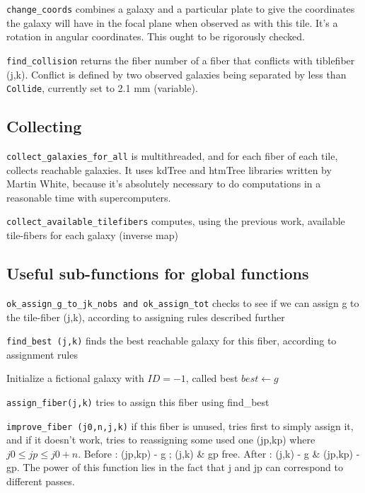 \documentclass{extarticle}
\begin{document}
{\tt change\_coords} combines a galaxy and a particular plate to give the coordinates the galaxy will have in the focal plane when observed as with this tile. It's a rotation in angular coordinates. This ought to be rigorously checked.

{\tt find\_collision} returns the fiber number of a fiber that conflicts with tiblefiber (j,k).  Conflict is defined by two observed galaxies being separated by less than {\tt Collide}, currently set to 2.1 mm (variable).

\subsection{Collecting}
{\tt collect\_galaxies\_for\_all} is multithreaded, and for each fiber of each tile, collects reachable galaxies. It uses kdTree and htmTree libraries written by Martin White, because it's absolutely necessary to do computations in a reasonable time with supercomputers.

{\tt collect\_available\_tilefibers} computes, using the previous work, available tile-fibers for each galaxy (inverse map)

\subsection{Useful sub-functions for global functions}

{\tt ok\_assign\_g\_to\_jk\_nobs and ok\_assign\_tot} checks to see if we can assign g to the tile-fiber (j,k), according to assigning rules described further

{\tt find\_best (j,k)} finds the best reachable galaxy for this fiber, according to assignment rules

\begin{algorithm}[H]
	\caption{Find best(j,k)}\label{euclid}
	\begin{algorithmic}[1]
		\State Initialize a fictional galaxy with $ID=-1$, called best
		\State $best \gets g$
		\EndIf
		\EndFor
	\end{algorithmic}
\end{algorithm}

{\tt assign\_fiber(j,k)} tries to assign this fiber using find\_best

{\tt improve\_fiber (j0,n,j,k)} if this fiber is unused, tries first to simply assign it, and if it doesn't work, tries to reassigning some used one (jp,kp) where $j0\le jp \le j0+n$. Before : (jp,kp) - g ; (j,k) \& gp free. After : (j,k) - g \& (jp,kp) - gp. The power of this function lies in the fact that j and jp can correspond to different passes.
\end{document}
